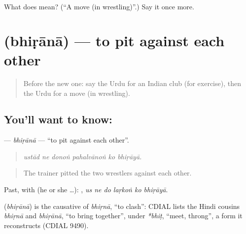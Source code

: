 \begin{tcolorbox}[breakable,colback=teal!4,colframe=teal!35!black,title={Before you move on}]
What does  mean? (\textquotedblleft{}A move (in wrestling)\textquotedblright{}.) Say it once more.
\end{tcolorbox}
\section[\texorpdfstring{\ur{بھڑانا} (bhiṛānā)}{بھڑانا (bhiṛānā)}]{ (bhiṛānā) — to pit against each other}

\label{lesson:UR-C520-bhirana}



\begin{quote}
Before the new one: say the Urdu for an Indian club (for exercise), then the Urdu for a move (in wrestling).
\end{quote}

\subsection*{You'll want to know: }
\textbf{} — \emph{bhiṛānā} — \textquotedblleft{}to pit against each other\textquotedblright{}.

\begin{quote}
     
\end{quote}

\begin{quote}
\emph{ustād ne donoṅ pahalvānoṅ ko bhiṛāyā.}
\end{quote}

\begin{quote}
The trainer pitted the two wrestlers against each other.
\end{quote}

Past, with  (he or she …):      , \emph{us ne do laṛkoṅ ko bhiṛāyā}.

\begin{cousinweb}
\textbf{} (\emph{bhiṛānā}) is the causative of \emph{bhiṛnā}, \textquotedblleft{}to clash\textquotedblright{}: CDIAL lists the Hindi cousins \emph{bhiṛnā} and \emph{bhiṛānā}, \textquotedblleft{}to bring together\textquotedblright{}, under \emph{*bhiṭ}, \textquotedblleft{}meet, throng\textquotedblright{}, a form it reconstructs (CDIAL 9490).
\end{cousinweb}

